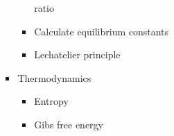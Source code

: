 \documentclass{article}
\begin{document}
\begin{itemize}
\begin{itemize}
\begin{itemize}
\begin{itemize}
								ratio
								\item Calculate
								equilibrium constants
								\item Lechatelier
								principle
							\end{itemize}
						\item Thermodynamics
							\begin{itemize}
								\item Entropy
								\item Gibs free energy
							\end{itemize}
					\end{itemize}
			\end{itemize}
	\end{itemize}
\end{document}
